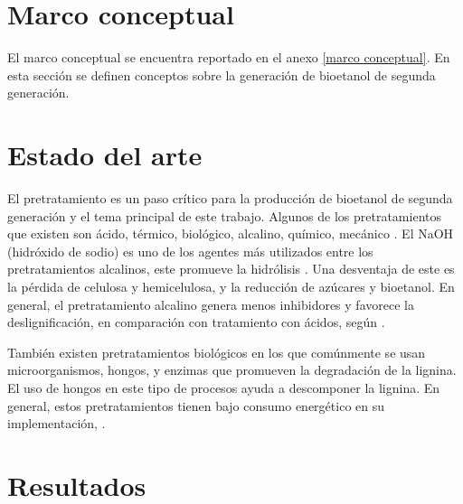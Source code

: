 \documentclass[12pt]{article}
\begin{document}
	\section{Marco conceptual}
	

	
	
	El marco conceptual se encuentra reportado en el anexo	\ref{marco conceptual}. En esta sección se definen conceptos sobre la generación de bioetanol de segunda generación.
	
	

	\section{Estado del arte}
	
	El pretratamiento es un paso crítico para la producción de bioetanol de segunda generación y el tema principal de este trabajo. Algunos de los pretratamientos que existen son ácido, térmico, biológico, alcalino, químico, mecánico \cite{ADITIYA2016631}.
	El  NaOH (hidróxido de sodio) es uno de los agentes más utilizados entre los pretratamientos alcalinos, este promueve la hidrólisis \cite{espinosa2021pretratamiento}. Una desventaja de este es la pérdida de celulosa y hemicelulosa, y la reducción de azúcares y bioetanol.
	En general, el pretratamiento alcalino genera menos inhibidores y favorece la deslignificación, en comparación con tratamiento con ácidos, según \cite{valles2022estudio}. 
	
	También existen pretratamientos biológicos en los que comúnmente se usan microorganismos, hongos, y enzimas que promueven la degradación de la lignina. El uso de hongos en este tipo de procesos ayuda a descomponer la lignina. En general, estos pretratamientos tienen bajo consumo energético en su implementación, \cite{Gonzalez2018desarrollo}. 
	
	
	
	\section{Resultados}
	
\end{document}

